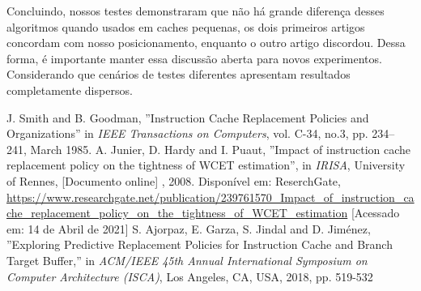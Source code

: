 \documentclass[conference]{IEEEtran}
\begin{document}
Concluindo, nossos testes demonstraram que não há grande diferença desses algoritmos quando usados em caches pequenas, os dois primeiros artigos
concordam com nosso posicionamento, enquanto o outro artigo discordou. Dessa forma, é importante manter essa discussão aberta para novos experimentos.
Considerando que cenários de testes diferentes apresentam resultados completamente dispersos.

\begin{thebibliography}{00}
 J. Smith and B. Goodman, ''Instruction Cache Replacement Policies and Organizations'' in \emph{IEEE Transactions on Computers}, vol. C-34, no.3, pp. 234--241, March 1985.
 A. Junier, D. Hardy and I. Puaut, ''Impact of instruction cache replacement policy on the tightness of WCET estimation'', in \emph{IRISA}, University of Rennes, [Documento online] , 2008. Disponível em: ReserchGate, \url{https://www.researchgate.net/publication/239761570_Impact_of_instruction_cache_replacement_policy_on_the_tightness_of_WCET_estimation} [Acessado em: 14 de Abril de 2021] 
 S. Ajorpaz, E. Garza, S. Jindal and D. Jiménez, ''Exploring Predictive Replacement Policies for Instruction Cache and Branch Target Buffer,'' in \emph{ACM/IEEE 45th Annual International Symposium on Computer Architecture (ISCA)}, Los Angeles, CA, USA, 2018, pp. 519-532
\end{thebibliography}
\end{document}
